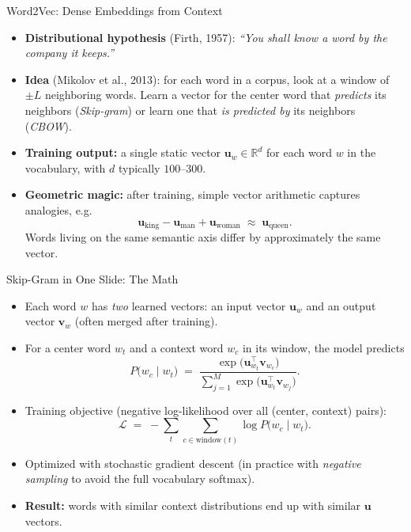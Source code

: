 \begin{frame}{Word2Vec: Dense Embeddings from Context}
\begin{itemize}
\item \textbf{Distributional hypothesis} (Firth, 1957): \emph{``You shall know a word by the company it keeps.''}

\medskip
\item \textbf{Idea} (Mikolov et al., 2013): for each word in a corpus, look at a window of $\pm L$ neighboring words. Learn a vector for the center word that \emph{predicts} its neighbors (\emph{Skip-gram}) or learn one that \emph{is predicted by} its neighbors (\emph{CBOW}).

\medskip
\item \textbf{Training output:} a single static vector $\mathbf{u}_w \in \mathbb{R}^{d}$ for each word $w$ in the vocabulary, with $d$ typically $100$--$300$.

\medskip
\item \textbf{Geometric magic:} after training, simple vector arithmetic captures analogies, e.g.
\[
   \mathbf{u}_{\text{king}} - \mathbf{u}_{\text{man}} + \mathbf{u}_{\text{woman}} \;\approx\; \mathbf{u}_{\text{queen}}.
\]
Words living on the same semantic axis differ by approximately the same vector.
\end{itemize}
\end{frame}

\begin{frame}{Skip-Gram in One Slide: The Math}
\begin{itemize}
\item Each word $w$ has \emph{two} learned vectors: an input vector $\mathbf{u}_{w}$ and an output vector $\mathbf{v}_{w}$ (often merged after training).

\medskip
\item For a center word $w_t$ and a context word $w_c$ in its window, the model predicts
\[
   P\bigl(w_c \mid w_t\bigr) \;=\; \frac{\exp\bigl(\mathbf{u}_{w_t}^{\top} \mathbf{v}_{w_c}\bigr)}{\sum_{j=1}^{M}\exp\bigl(\mathbf{u}_{w_t}^{\top} \mathbf{v}_{w_j}\bigr)}.
\]

\medskip
\item Training objective (negative log-likelihood over all (center, context) pairs):
\[
   \mathcal{L} \;=\; -\sum_{t}\sum_{c \in \text{window}(t)} \log P\bigl(w_c \mid w_t\bigr).
\]

\medskip
\item Optimized with stochastic gradient descent (in practice with \emph{negative sampling} to avoid the full vocabulary softmax).

\medskip
\item \textbf{Result:} words with similar context distributions end up with similar $\mathbf{u}$ vectors.
\end{itemize}
\end{frame}


